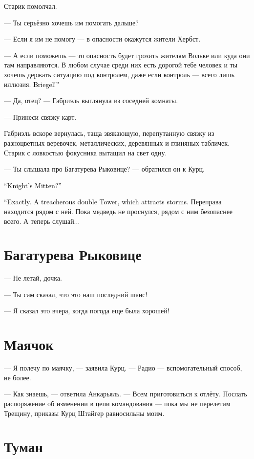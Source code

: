 \documentclass[a4paper,10pt,fleqn]{book}\usepackage{polyglossia}\setdefaultlanguage{english}\setotherlanguage{russian}\defaultfontfeatures{Ligatures=TeX,Mapping=tex-text}\usepackage{xcolor}\definecolor{lightgray}{HTML}{bbbbbb}\color{lightgray}\newcommand{\ml}[3]{\textcolor{black}{#3}}
\begin{document}
Старик помолчал.

--- Ты серьёзно хочешь им помогать дальше?

--- Если я им не помогу --- в опасности окажутся жители Хербст.

--- А если поможешь --- то опасность будет грозить жителям Вольке или куда они там направляются.
В любом случае среди них есть дорогой тебе человек и ты хочешь держать ситуацию под контролем, даже если контроль --- всего лишь иллюзия.
\ml{$0$}
{Бригель!}
{Briegel!''}

--- Да, отец? --- Габриэль выглянула из соседней комнаты.

--- Принеси связку карт.

Габриэль вскоре вернулась, таща звякающую, перепутанную связку из разноцветных веревочек, металлических, деревянных и глиняных табличек.
Старик с ловкостью фокусника вытащил на свет одну.

--- Ты слышала про Багатурева Рыковице? --- обратился он к Курц.

\ml{$0$}
{--- Перчатка Рыцаря?}
{``Knight's Mitten?''}

\ml{$0$}
{--- Именно.}
{``Exactly.}
\ml{$0$}
{Коварная двойная Башня, которая притягивает бури.}
{A treacherous double Tower, which attracts storms.}
Переправа находится рядом с ней.
Пока медведь не проснулся, рядом с ним безопаснее всего.
А теперь слушай...

\section{Багатурева Рыковице}

--- Не летай, дочка.

--- Ты сам сказал, что это наш последний шанс!

--- Я сказал это вчера, когда погода еще была хорошей!

\section{Маячок}

--- Я полечу по маячку, --- заявила Курц.
--- Радио --- вспомогательный способ, не более.

--- Как знаешь, --- ответила Анкарьяль.
--- Всем приготовиться к отлёту.
Послать распоряжение об изменении в цепи командования --- пока мы не перелетим Трещину, приказы Курц Штайгер равносильны моим.

\section{Туман}
\end{document}
